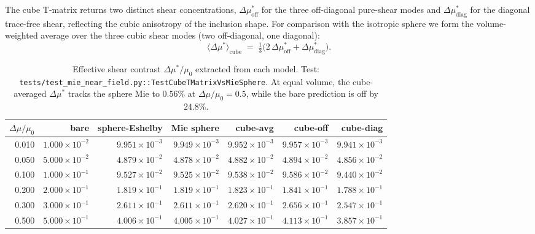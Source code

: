 \documentclass[11pt,a4paper]{article}
\newcommand{\D}{\Delta}
\newcommand{\code}[1]{\texttt{#1}}
\begin{document}
The cube T-matrix returns two distinct shear concentrations,
$\D\mu^*_{\mathrm{off}}$ for the three off-diagonal pure-shear modes and
$\D\mu^*_{\mathrm{diag}}$ for the diagonal trace-free shear, reflecting
the cubic anisotropy of the inclusion shape.  For comparison with the
isotropic sphere we form the volume-weighted average over the three
cubic shear modes (two off-diagonal, one diagonal):
\begin{equation}
\bigl\langle \D\mu^*\bigr\rangle_{\mathrm{cube}}
  \;=\; \tfrac{1}{3}\bigl(2\,\D\mu^*_{\mathrm{off}} + \D\mu^*_{\mathrm{diag}}\bigr).
\label{eq:cube-avg}
\end{equation}

\begin{table}[h]
\centering
\setlength{\tabcolsep}{4pt}
\begin{tabular}{rrrrrrr}
\toprule
$\D\mu/\mu_0$ & bare & sphere-Eshelby & Mie sphere &
cube-avg & cube-off & cube-diag \\
\midrule
0.010 & $1.000\times10^{-2}$ & $9.951\times10^{-3}$ & $9.949\times10^{-3}$ & $9.952\times10^{-3}$ & $9.957\times10^{-3}$ & $9.941\times10^{-3}$ \\
0.050 & $5.000\times10^{-2}$ & $4.879\times10^{-2}$ & $4.878\times10^{-2}$ & $4.882\times10^{-2}$ & $4.894\times10^{-2}$ & $4.856\times10^{-2}$ \\
0.100 & $1.000\times10^{-1}$ & $9.527\times10^{-2}$ & $9.525\times10^{-2}$ & $9.538\times10^{-2}$ & $9.586\times10^{-2}$ & $9.440\times10^{-2}$ \\
0.200 & $2.000\times10^{-1}$ & $1.819\times10^{-1}$ & $1.819\times10^{-1}$ & $1.823\times10^{-1}$ & $1.841\times10^{-1}$ & $1.788\times10^{-1}$ \\
0.300 & $3.000\times10^{-1}$ & $2.611\times10^{-1}$ & $2.611\times10^{-1}$ & $2.620\times10^{-1}$ & $2.656\times10^{-1}$ & $2.547\times10^{-1}$ \\
0.500 & $5.000\times10^{-1}$ & $4.006\times10^{-1}$ & $4.005\times10^{-1}$ & $4.027\times10^{-1}$ & $4.113\times10^{-1}$ & $3.857\times10^{-1}$ \\
\bottomrule
\end{tabular}
\caption{Effective shear contrast $\D\mu^*/\mu_0$ extracted from each
model.  Test:
\code{tests/test\_mie\_near\_field.py::TestCubeTMatrixVsMieSphere}.
At equal volume, the cube-averaged $\D\mu^*$ tracks the sphere Mie to
$0.56\%$ at $\D\mu/\mu_0=0.5$, while the bare prediction is off by
$24.8\%$.}
\label{tab:cube-vs-mie}
\end{table}
\end{document}
